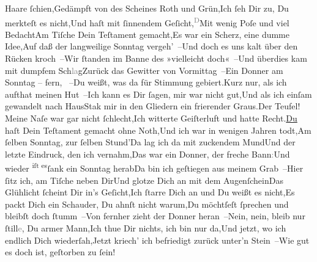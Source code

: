                   Haare ſchien,Gedämpft von des Scheines Roth und Grün,Ich ſeh Dir zu, Du merkteſt es nicht,Und haſt mit ſinnendem Geſicht,\substVorne{}\textsuperscript{\textcolor{gray}{D}}\substDazwischen{}M\substHinten{}it wenig Poſe und viel BedachtAm Tiſche Dein Teſtament gemacht,Es war ein Scherz, eine dumme Idee,Auf daß der langweilige Sonntag vergeh’ –Und doch es uns kalt über den Rücken kroch –Wir ſtanden im Banne des »vielleicht doch« –Und überdies kam mit dumpfem Sch\textcolor{gray}{la}gZurück das Gewitter von Vormittag –Ein Donner am Sonntag – fern, \label{K_L02647-2v}\label{K_L02647-2} –Du weißt, was da für Stimmung gebiert.{\pb}Kurz nur, als ich aufthat meinen Hut –Ich kann es Dir ſagen, mir war nicht gut,Und als ich einſam gewandelt nach HausStak mir in den Gliedern ein frierender Graus.Der Teufel! Meine Naſe war gar nicht ſchlecht,Ich witterte Geiſterluft und hatte Recht.\uline{Du} haſt Dein Teſtament gemacht ohne Noth,Und ich war in wenigen Jahren todt,Am ſelben Sonntag, zur ſelben Stund’Da lag ich da mit zuckendem MundUnd der letzte Eindruck, den ich vernahm,Das war ein Donner, der freche Bann\textcolor{gray}{:}Und wieder \substVorne{}\textsuperscript{iſt es}\substDazwischen{}ſank\substHinten{} ein Sonntag herabDa bin ich geſtiegen aus meinem Grab –Hier ſitz ich, am Tiſche neben DirUnd glotze Dich an mit dem AugenſcheinDas Glühlicht ſcheint Dir in’s Geſicht,Ich ſtarre Dich an und Du weißt es nicht,{\pb}Es packt Dich ein Schauder, Du  ahnſt nicht warum,Du möchtſeſt ſprechen und bleibſt doch ſtumm –Von fernher zieht der Donner heran –Nein, nein, bleib nur ſtill\textcolor{gray}{e}, Du armer Mann,Ich thue Dir nichts, ich bin nur da,Und jetzt, wo ich endlich Dich wiederſah,Jetzt kriech’ ich befriedigt zurück unter’n Stein –Wie gut es doch ist, geſtorben zu ſein!\stanzaend{}\endnumbering{}  
      